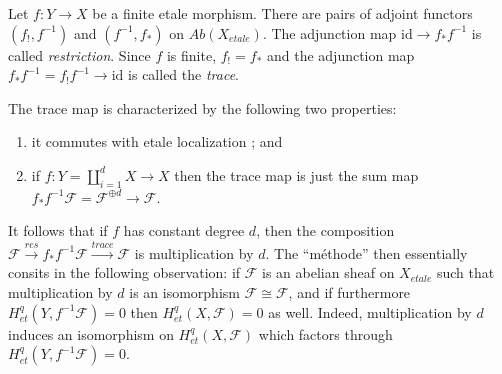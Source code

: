 \begin{definition}
\label{definition-trace-map}
Let $f : Y \to X$ be a finite etale morphism. There are pairs of adjoint
functors $(f_!,f^{-1})$ and $(f^{-1},f_*)$ on $\textit{Ab}(X_{etale})$. The
adjunction map $\text{id} \to f_* f^{-1}$ is called {\it restriction}. Since
$f$ is finite, $f_! = f_*$ and the adjunction map $f_* f^{-1} = f_! f^{-1} \to
\text{id}$ is called the {\it trace}.
\end{definition}

\noindent
The trace map is characterized by the following two properties:
\begin{enumerate}
\item
it commutes with etale localization ; and
\item
if $f: Y = \coprod_{i=1}^d X \to X$ then the trace map is just the sum map $f_*
f^{-1} \mathcal{F} = \mathcal{F}^{\oplus d} \to \mathcal{F}$.
\end{enumerate}
It follows that if $f$ has constant degree $d$, then the composition
$\mathcal{F} \xrightarrow{res} f_* f^{-1} \mathcal{F} \xrightarrow{trace}
\mathcal{F}$ is multiplication by $d$. The ``m\'ethode'' then essentially
consits in the following observation: if $\mathcal{F}$ is an abelian sheaf on
$X_{etale}$ such that multiplication by $d$ is an isomorphism $\mathcal{F} \cong
\mathcal{F}$, and if furthermore $H_{et}^q(Y,f^{-1}\mathcal{F}) = 0$ then
$H_{et}^q(X,\mathcal{F}) = 0$ as well. Indeed, multiplication by $d$ induces an
isomorphism on $H_{et}^q(X, \mathcal{F})$ which factors through
$H_{et}^q(Y,f^{-1}\mathcal{F})= 0$.

